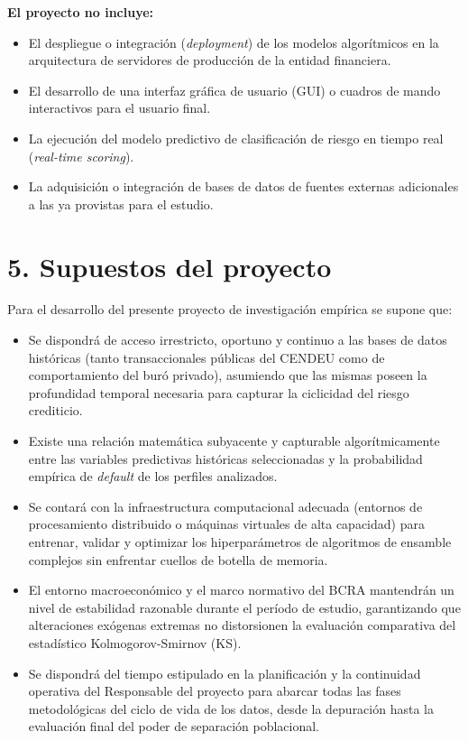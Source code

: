 \documentclass[
11pt, %
codirector, %
]{charter}
\begin{document}
\textbf{El proyecto no incluye:}
\begin{itemize}
\item El despliegue o integración (\textit{deployment}) de los modelos algorítmicos en la arquitectura de servidores de producción de la entidad financiera.
\item El desarrollo de una interfaz gráfica de usuario (GUI) o cuadros de mando interactivos para el usuario final.
\item La ejecución del modelo predictivo de clasificación de riesgo en tiempo real (\textit{real-time scoring}).
\item La adquisición o integración de bases de datos de fuentes externas adicionales a las ya provistas para el estudio.
\end{itemize}


\section{5. Supuestos del proyecto}
\label{sec:supuestos}

Para el desarrollo del presente proyecto de investigación empírica se supone que:
\begin{itemize}
\item Se dispondrá de acceso irrestricto, oportuno y continuo a las bases de datos históricas (tanto transaccionales públicas del CENDEU como de comportamiento del buró privado), asumiendo que las mismas poseen la profundidad temporal necesaria para capturar la ciclicidad del riesgo crediticio.
\item Existe una relación matemática subyacente y capturable algorítmicamente entre las variables predictivas históricas seleccionadas y la probabilidad empírica de \textit{default} de los perfiles analizados.
\item Se contará con la infraestructura computacional adecuada (entornos de procesamiento distribuido o máquinas virtuales de alta capacidad) para entrenar, validar y optimizar los hiperparámetros de algoritmos de ensamble complejos sin enfrentar cuellos de botella de memoria.
\item El entorno macroeconómico y el marco normativo del BCRA mantendrán un nivel de estabilidad razonable durante el período de estudio, garantizando que alteraciones exógenas extremas no distorsionen la evaluación comparativa del estadístico Kolmogorov-Smirnov (KS).
\item Se dispondrá del tiempo estipulado en la planificación y la continuidad operativa del Responsable del proyecto para abarcar todas las fases metodológicas del ciclo de vida de los datos, desde la depuración hasta la evaluación final del poder de separación poblacional.
\end{itemize}
\end{document}
